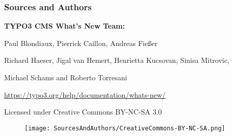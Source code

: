 
\begin{frame}[fragile]
	\frametitle{Sources and Authors}

	\vspace{-0.6cm}

	\centerline{\textbf{TYPO3 CMS What's New Team:}}

	\begin{center}
		\centerline{Paul Blondiaux, Pierrick Caillon, Andreas Fießer}
		\centerline{Richard Haeser, Jigal van Hemert, Henrietta Kucsovan, Sinisa Mitrovic,}
		\centerline{Michael Schams and Roberto Torresani}
	\end{center}

	\vspace{0.6cm}

	\smaller\begin{center}\url{https://typo3.org/help/documentation/whats-new/}\end{center}\normalsize

	\vspace{1cm}

	\smaller\begin{center}Licensed under Creative Commons BY-NC-SA 3.0\end{center}\normalsize
	\begin{figure}\vspace*{-0.4cm}
		\texttt{[image: SourcesAndAuthors/CreativeCommons-BY-NC-SA.png]}
	\end{figure}

\end{frame}

